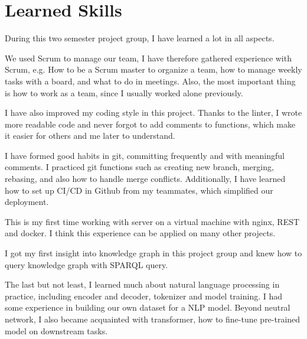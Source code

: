
\section{Learned Skills}

During this two semester project group,
I have learned a lot in all aspects. 

We used Scrum to manage our team,
I have therefore gathered experience with Scrum, 
e.g. How to be a Scrum master to organize a team, 
how to manage weekly tasks with a board, 
and what to do in meetings. 
Also, the most important thing is how to work as a team, 
since I usually worked alone previously. 

I have also improved my coding style in this project. 
Thanks to the linter, 
I wrote more readable code and never forgot to add comments to functions, 
which make it easier for others and me later to understand.

I have formed good habits in git, 
committing frequently and with meaningful comments. 
I practiced git functions such as creating new branch, merging, rebasing, 
and also how to handle merge conflicts.
Additionally, I have learned how to set up CI/CD in Github from my teammates, 
which simplified our deployment.

This is my first time working with server on a virtual machine
with nginx, REST and docker. 
I think this experience can be applied on many other projects. 

I got my first insight into knowledge graph in this project group
and knew how to query knowledge graph with SPARQL query. 

The last but not least,
I learned much about natural language processing in practice, 
including encoder and decoder, tokenizer and model training. 
I had some experience in building our own dataset for a NLP model. 
Beyond neutral network, I also became acquainted with transformer,
how to fine-tune pre-trained model on downstream tasks. 
